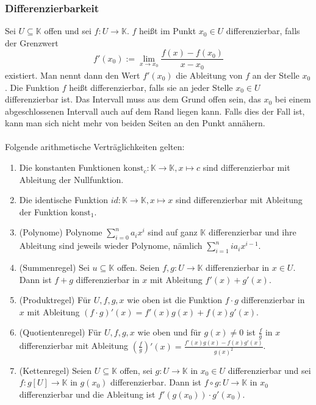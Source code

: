 \documentclass[a4paper,12pt]{article}
\numberwithin{equation}{section}
\begin{document}
\subsubsection{Differenzierbarkeit}
Sei $U\subseteq \mathbb{K}$ offen und sei $f:U\rightarrow \mathbb{K}$. $f$ heißt im Punkt $x_0 \in U$ differenzierbar, falls der Grenzwert 
\[ 
        f'\left(x_0\right):=\lim_{x\rightarrow x_0}\dfrac{f\left(x\right)-f\left(x_0\right)}{x-x_0}
\] 
existiert. Man nennt dann den Wert $f'\left(x_0\right)$ die Ableitung von $f$ an der Stelle $x_0$. Die Funktion $f$ heißt differenzierbar, falls sie an jeder Stelle $x_0 \in U$ differenzierbar ist. Das Intervall muss aus dem Grund offen sein, das $x_0$ bei einem abgeschlossenen Intervall auch auf dem Rand liegen kann. Falls dies der Fall ist, kann man sich nicht mehr von beiden Seiten an den Punkt annähern.\\\\
Folgende arithmetische Verträglichkeiten gelten:
\begin{enumerate}[label=(\alph*)]
        \item Die konstanten Funktionen $\text{konst}_c:\mathbb{K}\rightarrow \mathbb{K},x\mapsto c$ sind differenzierbar mit Ableitung der Nullfunktion.
        \item Die identische Funktion $id:\mathbb{K}\rightarrow \mathbb{K},x\mapsto x$ sind differenzierbar mit Ableitung der Funktion $\text{konst}_1$.
        \item (Polynome) Polynome $\sum_{i=0}^{n}a_ix^i$ sind auf ganz $\mathbb{K}$ differenzierbar und ihre Ableitung sind jeweils wieder Polynome, nämlich $\sum_{i=1}^{n}ia_ix^{i-1}$.
        \item (Summenregel) Sei $u\subseteq \mathbb{K}$ offen. Seien $f,g:U\rightarrow \mathbb{K}$ differenzierbar in $x \in U$. Dann ist $f+g$ differenzierbar in $x$ mit Ableitung $f'\left(x\right)+g'\left(x\right)$.
        \item (Produktregel) Für $U,f,g,x$ wie oben ist die Funktion $f\cdot g$ differenzierbar in $x$ mit Ableitung $\left(f\cdot g\right)'\left(x\right)=f'\left(x\right)g\left(x\right)+f\left(x\right)g'\left(x\right)$.
        \item (Quotientenregel) Für $U,f,g,x$ wie oben und für $g\left(x\right)\neq 0$ ist $\tfrac{f}{g}$ in $x$ differenzierbar mit Ableitung $\left(\tfrac{f}{g}\right)'\left(x\right)=\tfrac{f'\left(x\right)g\left(x\right)-f\left(x\right)g'\left(x\right)}{g\left(x\right)^2}$.
        \item (Kettenregel) Seien $U\subseteq \mathbb{K}$ offen, sei $g:U\rightarrow \mathbb{K}$ in $x_0 \in U$ differenzierbar und sei $f:g[U]\rightarrow \mathbb{K}$ in $g\left(x_0\right)$ differenzierbar. Dann ist $f\circ g:U\rightarrow \mathbb{K}$ in $x_0$ differenzierbar und die Ableitung ist $f'\left(g\left(x_0\right)\right)\cdot g'\left(x_0\right)$.
\end{enumerate}
\end{document}
